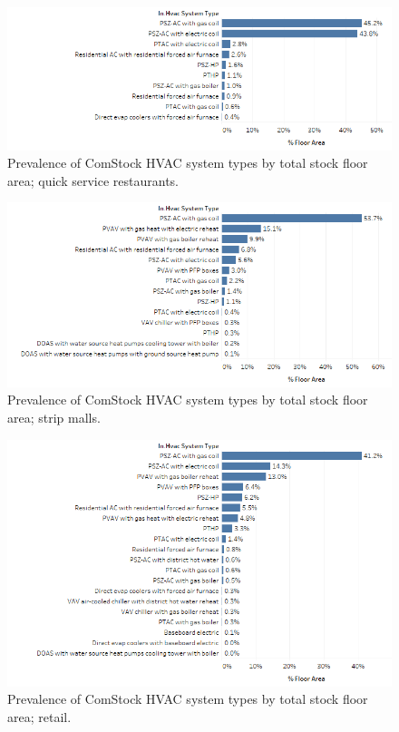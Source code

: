 \begin{figure}
    \centering \includegraphics[width=1.0\textwidth]{figures/HVAC_SYS_Type_PREV_QSR.png}
    \caption[HVAC system type prevalence in quick service restaurants]{Prevalence of ComStock HVAC system types by total stock floor area; quick service restaurants.}
    \label{fig:hvac_sys_type_prevalence_qsr}
\end{figure}

\begin{figure}
    \centering \includegraphics[width=1.0\textwidth]{figures/HVAC_SYS_Type_PREV_Retail_Stripmall.png}
    \caption[HVAC system type prevalence in strip malls]{Prevalence of ComStock HVAC system types by total stock floor area; strip malls.}
    \label{fig:hvac_sys_type_prevalence_retail_strip_mall}
\end{figure}

\begin{figure}
    \centering \includegraphics[width=1.0\textwidth]{figures/HVAC_SYS_Type_PREV_Retail.png}
    \caption[HVAC system type prevalence in retail]{Prevalence of ComStock HVAC system types by total stock floor area; retail.}
    \label{fig:hvac_sys_type_prevalence_retail}
\end{figure}

